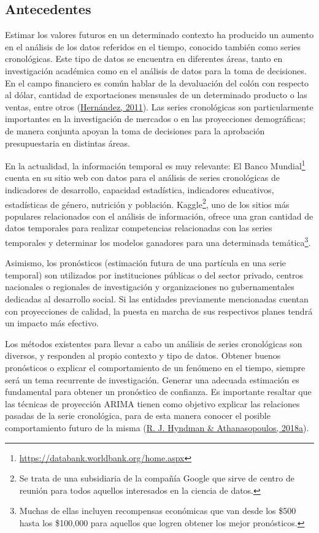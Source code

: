 \documentclass[
]{article}
\begin{document}
\subsection{Antecedentes}

Estimar los valores futuros en un determinado contexto ha producido un
aumento en el análisis de los datos referidos en el tiempo, conocido
también como series cronológicas. Este tipo de datos se encuentra en
diferentes áreas, tanto en investigación académica como en el análisis
de datos para la toma de decisiones. En el campo financiero es común
hablar de la devaluación del colón con respecto al dólar, cantidad de
exportaciones mensuales de un determinado producto o las ventas, entre
otros (\protect\hyperlink{ref-oscarh-1}{Hernández, 2011}). Las series
cronológicas son particularmente importantes en la investigación de
mercados o en las proyecciones demográficas; de manera conjunta apoyan
la toma de decisiones para la aprobación presupuestaria en distintas
áreas.

En la actualidad, la información temporal es muy relevante: El Banco
Mundial\footnote{\url{https://databank.worldbank.org/home.aspx}} cuenta
en su sitio web con datos para el análisis de series cronológicas de
indicadores de desarrollo, capacidad estadística, indicadores
educativos, estadísticas de género, nutrición y población.
Kaggle\footnote{Se trata de una subsidiaria de la compañía Google que
  sirve de centro de reunión para todos aquellos interesados en la
  ciencia de datos.}, uno de los sitios más populares relacionados con
el análisis de información, ofrece una gran cantidad de datos temporales
para realizar competencias relacionadas con las series temporales y
determinar los modelos ganadores para una determinada
temática\footnote{Muchas de ellas incluyen recompensas económicas que
  van desde los \$500 hasta los \$100,000 para aquellos que logren
  obtener los mejor pronósticos.}.

Asimismo, los pronósticos (estimación futura de una partícula en una
serie temporal) son utilizados por instituciones públicas o del sector
privado, centros nacionales o regionales de investigación y
organizaciones no gubernamentales dedicadas al desarrollo social. Si las
entidades previamente mencionadas cuentan con proyecciones de calidad,
la puesta en marcha de sus respectivos planes tendrá un impacto más
efectivo.

Los métodos existentes para llevar a cabo un análisis de series
cronológicas son diversos, y responden al propio contexto y tipo de
datos. Obtener buenos pronósticos o explicar el comportamiento de un
fenómeno en el tiempo, siempre será un tema recurrente de investigación.
Generar una adecuada estimación es fundamental para obtener un
pronóstico de confianza. Es importante resaltar que las técnicas de
proyección ARIMA tienen como objetivo explicar las relaciones pasadas de
la serie cronológica, para de esta manera conocer el posible
comportamiento futuro de la misma
(\protect\hyperlink{ref-hyndman2018forecasting}{R. J. Hyndman \&
Athanasopoulos, 2018a}).
\end{document}
